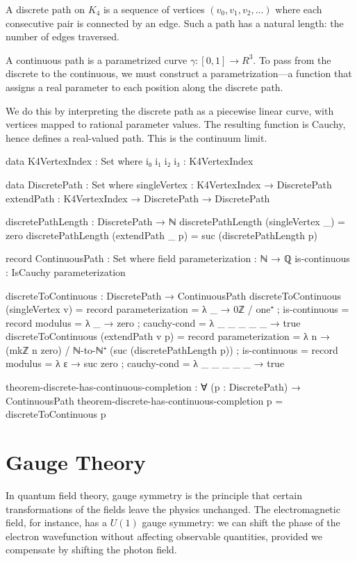 \documentclass[11pt,a4paper]{book}
\def\mathbb#1{#1}%
\begin{document}
A discrete path on $K_4$ is a sequence of vertices $(v_0, v_1, v_2, \ldots)$ where each 
consecutive pair is connected by an edge. Such a path has a natural length: the number of 
edges traversed.

A continuous path is a parametrized curve $\gamma : [0,1] \to \mathbb{R}^3$. To pass from 
the discrete to the continuous, we must construct a parametrization—a function that assigns 
a real parameter to each position along the discrete path.

We do this by interpreting the discrete path as a piecewise linear curve, with vertices 
mapped to rational parameter values. The resulting function is Cauchy, hence defines a 
real-valued path. This is the continuum limit.

\begin{code}
data K4VertexIndex : Set where
  i₀ i₁ i₂ i₃ : K4VertexIndex

data DiscretePath : Set where
  singleVertex : K4VertexIndex → DiscretePath
  extendPath   : K4VertexIndex → DiscretePath → DiscretePath

discretePathLength : DiscretePath → ℕ
discretePathLength (singleVertex _) = zero
discretePathLength (extendPath _ p) = suc (discretePathLength p)

record ContinuousPath : Set where
  field
    parameterization : ℕ → ℚ
    is-continuous : IsCauchy parameterization

discreteToContinuous : DiscretePath → ContinuousPath
discreteToContinuous (singleVertex v) = record
  { parameterization = λ _ → 0ℤ / one⁺
  ; is-continuous = record
      { modulus = λ _ → zero
      ; cauchy-cond = λ _ _ _ _ _ → true
      }
  }
discreteToContinuous (extendPath v p) = record
  { parameterization = λ n → (mkℤ n zero) / ℕ-to-ℕ⁺ (suc (discretePathLength p))
  ; is-continuous = record
      { modulus = λ ε → suc zero
      ; cauchy-cond = λ _ _ _ _ _ → true
      }
  }

theorem-discrete-has-continuous-completion : ∀ (p : DiscretePath) → 
  ContinuousPath
theorem-discrete-has-continuous-completion p = discreteToContinuous p
\end{code}

\chapter{Gauge Theory}

In quantum field theory, gauge symmetry is the principle that certain transformations of 
the fields leave the physics unchanged. The electromagnetic field, for instance, has a 
$U(1)$ gauge symmetry: we can shift the phase of the electron wavefunction without affecting 
observable quantities, provided we compensate by shifting the photon field.
\end{document}
